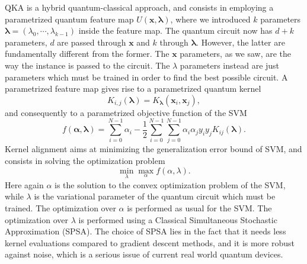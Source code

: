 \documentclass[12pt]{article}
\begin{document}
QKA is a hybrid quantum-classical approach, and consists in employing a parametrized quantum feature map $U(\mathbf{x}, \mathbf{\lambda})$, where we introduced $k$ parameters $\mathbf{\lambda}=(\lambda_0,\cdots, \lambda_{k-1})$ inside the feature map. The quantum circuit now has $d+k$ parameters, $d$ are passed through $\mathbf{x}$ and $k$ through $\mathbf{\lambda}$. However, the latter are fundamentally different from the former. The $\mathbf{x}$ parameters, as we saw, are the way the instance is passed to the circuit. The $\lambda$ parameters instead are just parameters which must be trained in order to find the best possible circuit. A parametrized feature map gives rise to a parametrized quantum kernel $$K_{i,j}(\mathbf{\lambda})=K_{\mathbf{\lambda}}(\mathbf{x}_i, \mathbf{x}_j),$$ and consequently to a parametrized objective function of the SVM
\begin{equation}
            f(\mathbf{\alpha}, \mathbf{\lambda})=\sum_{i=0}^{N-1} \alpha_i-\frac{1}{2}\sum_{i=0}^{N-1}\sum_{j=0}^{N-1}\alpha_i\alpha_jy_iy_jK_{ij}(\mathbf{\lambda}).
            \label{qka}
\end{equation}
Kernel alignment aims at minimizing the generalization error bound of SVM, and consists in solving the optimization problem
\begin{equation}
    \min_{\lambda}\max_{\alpha}f(\alpha, \lambda).
\end{equation} 
Here again $\alpha$ is the solution to the convex optimization problem of the SVM, while $\lambda$ is the variational parameter of the quantum circuit which must be trained. The optimization over $\alpha$ is performed as usual for the SVM. The optimization over $\lambda$ is performed using a Classical Simultaneous Stochastic Approximation (SPSA). The choice of SPSA lies in the fact that it needs less kernel evaluations compared to gradient descent methods, and it is more robust against noise, which is a serious issue of current real world quantum devices.    
\end{document}
